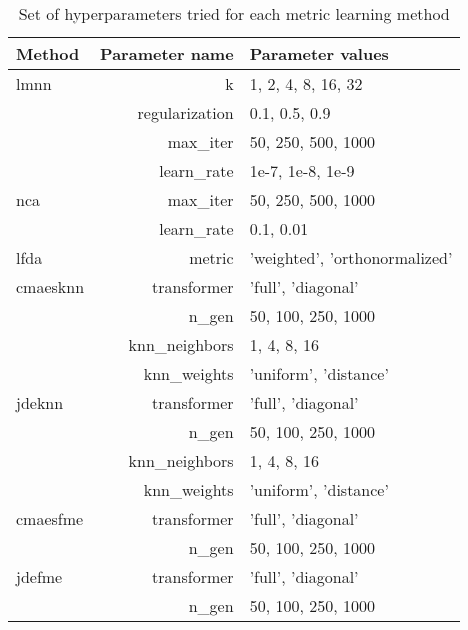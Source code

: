 \begin{table}[ht] \centering
\begin{tabular}{lrl}
\hline
Method & Parameter name & Parameter values \\
\hline

\ac{lmnn}
    & k & 1, 2, 4, 8, 16, 32  \\
    & regularization & 0.1, 0.5, 0.9  \\
    & max\_iter & 50, 250, 500, 1000  \\
    & learn\_rate & 1e-7, 1e-8, 1e-9  \\
\ac{nca}
    & max\_iter & 50, 250, 500, 1000  \\
    & learn\_rate & 0.1, 0.01  \\

\ac{lfda}
    & metric & 'weighted', 'orthonormalized'  \\

\ac{cmaesknn}
    & transformer & 'full', 'diagonal'  \\
    & n\_gen & 50, 100, 250, 1000  \\
    & knn\_neighbors & 1, 4, 8, 16  \\
    & knn\_weights & 'uniform', 'distance'  \\

\ac{jdeknn}
    & transformer & 'full', 'diagonal'  \\
    & n\_gen & 50, 100, 250, 1000  \\
    & knn\_neighbors & 1, 4, 8, 16  \\
    & knn\_weights & 'uniform', 'distance'  \\

\ac{cmaesfme}
    & transformer & 'full', 'diagonal'  \\
    & n\_gen & 50, 100, 250, 1000  \\

\ac{jdefme}
    & transformer & 'full', 'diagonal'  \\
    & n\_gen & 50, 100, 250, 1000  \\


\hline
\end{tabular}
\caption{Set of hyperparameters tried for each metric learning method} \label{tab:hyperparams}
\end{table}
